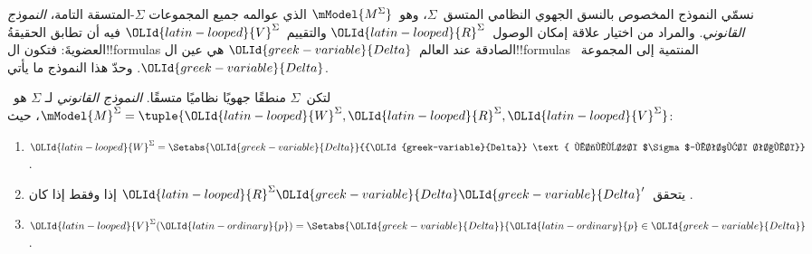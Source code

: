 \documentclass[../../../include/open-logic-section]{subfiles}
\begin{document}


نسمّي النموذج المخصوص بالنسق الجهوي النظامي المتسق~$\Sigma$،
وهو~$\mModel{M^\Sigma}$ الذي عوالمه جميع المجموعات
$\Sigma$-المتسقة التامة، \emph{النموذج القانوني}.
والمراد من اختيار علاقة إمكان الوصول~${\OLId{latin-looped}{R}}^\Sigma$ والتقييم~${\OLId{latin-looped}{V}}^\Sigma$
فيه أن تطابق الحقيقةُ العضويةَ: فتكون ال!!{formula}s الصادقة
عند العالم~${\OLId{greek-variable}{Delta}}$ هي عين ال!!{formula}s المنتمية إلى المجموعة~${\OLId{greek-variable}{Delta}}$.
وحدّ هذا النموذج ما يأتي.

\begin{defn}
  لتكن~$\Sigma$ منطقًا جهويًا نظاميًا متسقًا. \emph{النموذج القانوني} لـ
  $\Sigma$ هو~$\mModel{M}^\Sigma = \tuple{{\OLId{latin-looped}{W}}^\Sigma, {\OLId{latin-looped}{R}}^\Sigma,
    {\OLId{latin-looped}{V}}^\Sigma}$، حيث:
  \begin{enumerate}
  \item ${\OLId{latin-looped}{W}}^\Sigma = \Setabs{{\OLId{greek-variable}{Delta}}}{{\OLId{greek-variable}{Delta}} \text{ مجموعة
      $\Sigma$-متسقة تامة}}$.
  \item يتحقق~${\OLId{latin-looped}{R}}^\Sigma {\OLId{greek-variable}{Delta}}{\OLId{greek-variable}{Delta}}'$ إذا وفقط إذا كان
    .
  \item ${\OLId{latin-looped}{V}}^\Sigma({\OLId{latin-ordinary}{p}}) = \Setabs{{\OLId{greek-variable}{Delta}}}{{\OLId{latin-ordinary}{p}} \in {\OLId{greek-variable}{Delta}}}$.
  \end{enumerate}
\end{defn}
\end{document}
